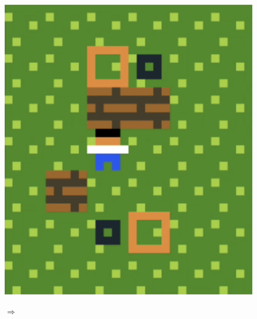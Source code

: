 \begin{description}
\begin{figure}[!htbp]
\centering
\begin{minipage}[t]{0.25\textwidth}
\includegraphics[width=\textwidth]{figures/windowdressingpart71.png} \hfill \\
\end{minipage}
$\Longrightarrow$
\begin{minipage}[t]{0.25\textwidth}

\end{minipage}
\end{figure}
\end{description}
